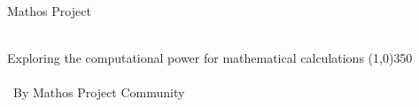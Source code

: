 \documentclass[11pt,a4paper]{report}
\begin{document}
\begin{titlepage}
\begin{center}
{\large Mathos Project}
\\\

{\huge Exploring the computational power for mathematical calculations}
\line(1,0){350}
\\\
\\\
{\small By Mathos Project Community} \\\
\resizebox{\linewidth}{!}{\itshape $\Pi$} %
\end{center}
\end{titlepage}



\setcounter{part}{-1}
\setcounter{chapter}{0}
\setcounter{section}{1}
\tableofcontents


\end{document}
